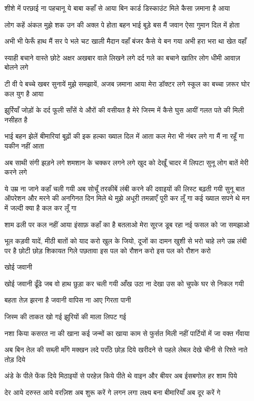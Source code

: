 शीशे में परछाई ना पहचानू
ये बाबा कहाँ से आया
बिन कार्ड डिस्काउंट मिले
कैसा ज़माना है आया

लोग कहें अंकल मुझे
शक उन की अक्ल पे होता
बहन भाई बूड़े बस मैं जवान
ऐसा गुमान दिल में होता

अभी भी फेरूँ हाथ मैं सर पे
भले चट खाली मैदान वहाँ
बंजर कैसे ये बन गया
अभी हरा भरा था खेत वहाँ

स्याही बचाने वास्ते छोटे अक्षर
अखबार वाले लिखने लगे
दर्द गले का बचाने खातिर
लोग धीमी आवाज़ बोलने लगे

टी वी पे बच्चे खबर सुनायें मुझे
समझायें, अजब ज़माना आया
मेरा डॉक्टर लगे स्कूल का बच्चा
ज़रूर घोर कल युग है आया


झुर्रियाँ जोड़ों के दर्द फूली साँसें
ये औरों की वसीयत है
मेरे जिस्म में कैसे घुस आयीं
गलत पते की मिली नसीहत है

 भाई बहन झेलें बीमारियां बूढ़ों की
इक हल्का ख्याल दिल में आता
कल मेरा भी नंबर लगे गा
मैं ना रहूँ गा यकीन नहीं आता


अब साथी संगी झड़ने लगे
शमशान के चक्कर लगने लगे
खुद को देखूँ चादर में लिपटा
सुनू लोग बातें मेरी करने लगे

ये उम्र ना जाने कहाँ चली गयी
अब सोचूँ तरकीबें लंबी करने की
दवाइयों की लिस्ट बढ़ती गयी
सुनू बात ऑपरेशन और मरने की
अनगिनत दिन मिले थे मुझे
अधूरी तमन्नाएँ पूरी कर लूँ गा
कई ख्याल सपने थे मन में
जल्दी क्या है कल कर लूँ गा

शाम ढली पर कल नहीं आया
इंसाफ़ कहाँ का है बतलाओ
मेरा सूरज डूब रहा
नई फसल को जा समझाओ



भूल कड़वी यादें, मीठी बातों को
याद करो
खुल के जियो, दूजों का दामन
खुशी से भरो
चाहे लगे उम्र लंबी पर है छोटी
छोड़ शिकायत गिले पछतावा
इस पल को रौशन करो
इस पल को रौशन करो


खोई जवानी

खोई जवानी ढूँढे जब वो
हाथ छुड़ा कर चली गयी
आँख उठा ना देखा उस को
चुपके घर से निकल गयी

बहता तेज़ झरना है जवानी
वापिस ना आए गिरता पानी

जिस्म की ताकत खो गई
झुरियों की माला लिपट गई

नशा किया कसरत ना की
खाना कई जन्मों का खाया
काम से फुर्सत मिली नहीं
पार्टियों में जा वक्त गँवाया

अब बिन तेल की सब्ज़ी माँगे
मक्खन लदे पराँठे छोड़ दिये
खरीदने से पहले लेबल देखे
चीनी से रिश्ते नाते तोड़ दिये

अंडे के पीले फेंक दिये
मिठाइयों से परहेज़ किये
पीते थे वाइन और बीयर
अब ईसबगोल हर शाम पिये

देर आये दरुस्त आये
वरज़िश अब शुरू करें गे
लगन लगा लक्ष्य बना
बीमारियाँ अब दूर करें गे

